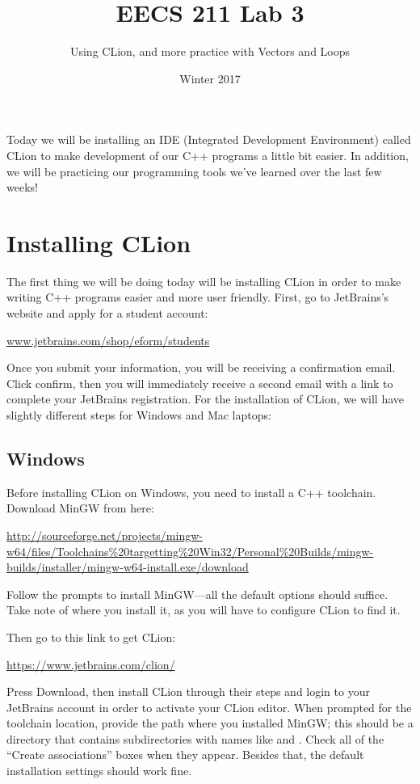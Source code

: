 \documentclass{tufte-handout}
\title{EECS 211 Lab 3}
\author{Using CLion, and more practice with Vectors and Loops}
\date{Winter 2017}
\begin{document}
\maketitle

Today we will be installing an IDE (Integrated Development Environment) called CLion to make development of our C++ programs a little bit easier.  In addition, we will be practicing our programming tools we've learned over the last few weeks!

\section{Installing CLion}

The first thing we will be doing today will be installing CLion in order
to make writing C++ programs easier and more user friendly.  First, go
to JetBrains's website and apply for a student account:
\medskip

\url{www.jetbrains.com/shop/eform/students} \medskip

\noindent
Once you submit your information, you will be receiving a confirmation
email.  Click confirm, then you will immediately receive a second email
with a link to complete your JetBrains registration. For the installation of CLion, we will have slightly different steps for Windows and Mac laptops:

\subsection{Windows}

Before installing CLion on Windows, you need to install a C++
toolchain. Download MinGW from here:

\medskip
\url{http://sourceforge.net/projects/mingw-w64/files/Toolchains%20targetting%20Win32/Personal%20Builds/mingw-builds/installer/mingw-w64-install.exe/download}

\medskip\noindent
Follow the prompts to install MinGW---all the default options should
suffice. Take note of where you install it, as you will have to
configure CLion to find it.

Then go to this link to get CLion:

\medskip
\url{https://www.jetbrains.com/clion/}

\medskip\noindent
Press Download, then install CLion through their steps
and login to your JetBrains account in order to activate your CLion
editor. When prompted for the toolchain location, provide the path where
you installed MinGW; this should be a directory that contains
subdirectories with names like  and . Check
all of the ``Create associations'' boxes when they appear. Besides that,
the default installation settings should work fine.
\end{document}
